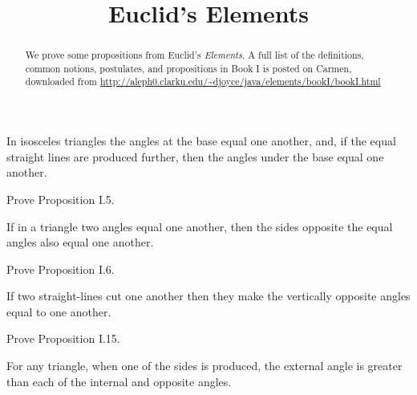 \documentclass{ximera}
\title{Euclid's Elements}
\begin{document}
\begin{abstract}
We prove some propositions from Euclid's \textit{Elements}. A full list of the definitions, common notions, postulates, and propositions in Book I is posted on Carmen, downloaded from \url{http://aleph0.clarku.edu/~djoyce/java/elements/bookI/bookI.html}
\end{abstract}

\maketitle





\begin{proposition}[I.5]
In isosceles triangles the angles at the base equal one another, and, if the equal straight lines are produced further, then the angles under the base equal one another.
\end{proposition}

\begin{question}
Prove Proposition I.5.
\end{question}

\begin{proposition}[I.6]
If in a triangle two angles equal one another, then the sides opposite the equal angles also equal one another.
\end{proposition}

\begin{question}
Prove Proposition I.6.
\end{question}


\begin{proposition}[I.15]
If two straight-lines cut one another then they make the vertically
opposite angles equal to one another.
\end{proposition}

\begin{question}
Prove Proposition I.15.
\end{question}

\begin{proposition}[I.16]
For any triangle, when one of the sides is produced, the external
angle is greater than each of the internal and opposite angles.
\begin{image}
\end{image}
\end{proposition}
\end{document}
